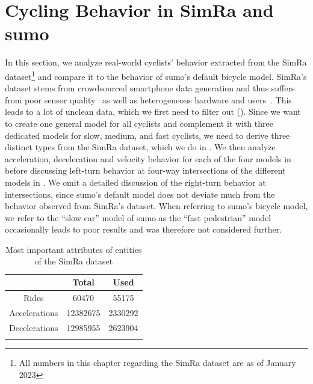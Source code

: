 \section{Cycling Behavior in SimRa and \ac{sumo}}
\label{sec:cycling_behavior_in_simra_and_sumo}
In this section, we analyze real-world cyclists' behavior extracted from the SimRa dataset\footnote{All numbers in this chapter regarding the SimRa dataset are as of January 2023} and compare it to the behavior of \ac{sumo}'s default bicycle model.
SimRa's dataset stems from crowdsourced smartphone data generation and thus suffers from poor sensor quality~\cite{chowdhury2014estimating, usami2018bicycle} as well as heterogeneous hardware and users~\cite{basiri2018impact}.
This leads to a lot of unclean data, which we first need to filter out ().
Since we want to create one general model for all cyclists and complement it with three dedicated models for slow, medium, and fast cyclists, we need to derive three distinct types from the SimRa dataset, which we do in .
We then analyze acceleration, deceleration and velocity behavior for each of the four models in  before discussing left-turn behavior at four-way intersections of the different models in .
We omit a detailed discussion of the right-turn behavior at intersections, since \ac{sumo}'s default model does not deviate much from the behavior observed from SimRa's dataset.
When referring to \ac{sumo}'s bicycle model, we refer to the ``slow car'' model of \ac{sumo} as the ``fast pedestrian'' model occasionally leads to poor results and was therefore not considered further.

\begin{table}
\centering
\caption{Most important attributes of entities of the SimRa dataset}%
\label{tab:dataset}
\begin{tabular}{ccc}
\toprule
& Total & Used \\
\midrule
\midrule
Rides & \num{60470} & \num{55175} \\
Accelerations & \num{12382675} & \num{2330292} \\
Decelerations & \num{12985955} & \num{2623904} \\
\bottomrule&
\end{tabular}
\end{table}

